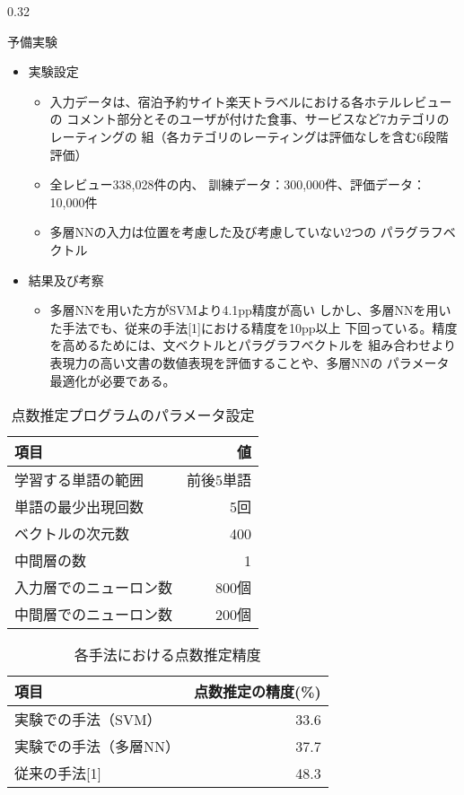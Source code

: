 \documentclass[10pt,unicode]{beamer}
\newcommand{\columnsize}{0.32}
\newcommand{\tablefontsize}{\small}
\newcommand{\itemtitle}[1]{{\large #1} \\}
\begin{document}
\begin{frame}{}
\begin{columns}[t]
\begin{column}{\columnsize\textwidth}
\begin{block}{予備実験}
\begin{itemize}
      \item \itemtitle{実験設定}
      \begin{itemize}
        \item 入力データは、宿泊予約サイト楽天トラベルにおける各ホテルレビューの
        コメント部分とそのユーザが付けた食事、サービスなど7カテゴリのレーティングの
        組（各カテゴリのレーティングは評価なしを含む6段階評価）
        \item 全レビュー338,028件の内、
        訓練データ：300,000件、評価データ：10,000件
        \item 多層NNの入力は位置を考慮した及び考慮していない2つの
        パラグラフベクトル
      \end{itemize}

      \item \itemtitle{結果及び考察}
      \begin{itemize}
        \item 多層NNを用いた方がSVMより4.1pp精度が高い
        しかし、多層NNを用いた手法でも、従来の手法[1]における精度を10pp以上
        下回っている。精度を高めるためには、文ベクトルとパラグラフベクトルを
        組み合わせより表現力の高い文書の数値表現を評価することや、多層NNの
        パラメータ最適化が必要である。
      \end{itemize}
    \end{itemize}

    \begin{table}
    \tablefontsize
    \caption{点数推定プログラムのパラメータ設定}
    \label{table:parameters}
    \begin{tabular}{l | r}
    項目 & 値 \\
    \hline
    学習する単語の範囲 & 前後5単語 \\
    単語の最少出現回数 & 5回 \\
    ベクトルの次元数 & 400 \\
    中間層の数 & 1 \\
    入力層でのニューロン数 & 800個 \\
    中間層でのニューロン数 & 200個
    \end{tabular}
    \end{table}

    \begin{table}
    \tablefontsize
    \caption{各手法における点数推定精度}
    \begin{tabular}{l | r}
    項目 & 点数推定の精度(\%) \\
    \hline
    実験での手法（SVM）& 33.6 \\
    実験での手法（多層NN）& 37.7 \\
    従来の手法[1] & 48.3
    \end{tabular}
    \end{table}
  \end{block} %


\end{column}
\end{columns}
\end{frame}
\end{document}
